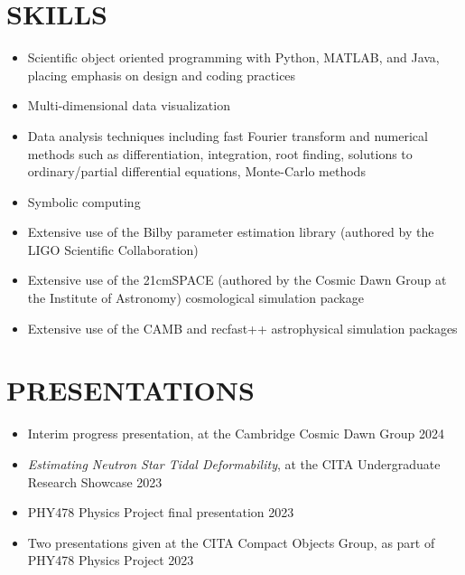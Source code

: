\documentclass[a4paper,10pt]{extarticle}
\begin{document}
\section*{SKILLS}
\begin{itemize}
    \item Scientific object oriented programming with Python, MATLAB, and Java, placing emphasis on design and coding practices

    \item Multi-dimensional data visualization

    \item Data analysis techniques including fast Fourier transform and numerical methods such as differentiation, integration, root finding, solutions to ordinary/partial differential equations, Monte-Carlo methods

    \item Symbolic computing

    \item Extensive use of the Bilby parameter estimation library (authored by the LIGO Scientific Collaboration)

    \item Extensive use of the 21cmSPACE (authored by the Cosmic Dawn Group at the Institute of Astronomy) cosmological simulation package
    
    \item Extensive use of the CAMB and recfast++ astrophysical simulation packages
\end{itemize}

\section*{PRESENTATIONS}
\begin{itemize}
    \item Interim progress presentation, at the Cambridge Cosmic Dawn Group \hfill 2024

    \item \textit{Estimating Neutron Star Tidal Deformability}, at the CITA Undergraduate Research Showcase \hfill 2023

    \item PHY478 Physics Project final presentation \hfill 2023

    \item Two presentations given at the CITA Compact Objects Group, as part of PHY478 Physics Project \hfill 2023
\end{itemize}
\end{document}
